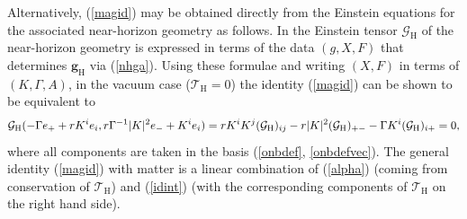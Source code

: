 \documentclass[11pt, reqno]{amsart}
\theoremstyle{plain}
\theoremstyle{definition}
\numberwithin{equation}{section}
\begin{document}
Alternatively, (\ref{magid}) may be obtained directly from the Einstein equations for the associated near-horizon geometry as follows. In \cite{KL13} the Einstein tensor $\mathcal{G}_{\text{H}}$ of the near-horizon geometry is expressed in terms of the data $(g,X,F)$ that determines $\textbf{g}_\text{H}$ via (\ref{nhga}). Using these formulae and writing $(X,F)$ in terms of $(K,\Gamma,A)$, in the vacuum case ($\mathcal{T}_{\text{H}} = 0$) the identity (\ref{magid}) can be shown to be equivalent to
\begin{equation} \label{idint}
\mathcal{G}_{\textup{H}}(-\Gamma e_++ rK^ie_i, r\Gamma^{-1}\vert K \vert^2e_- + K^ie_i) = rK^iK^j(\mathcal{G}_{\text{H}})_{ij} - r\vert K \vert^2(\mathcal{G}_{\text{H}})_{+-} - \Gamma K^i(\mathcal{G}_{\text{H}})_{i+} = 0,
\end{equation}
where all components are taken in the basis (\ref{onbdef}, \ref{onbdefvec}). The general identity (\ref{magid}) with matter is a linear combination of (\ref{alpha}) (coming from conservation of $\mathcal{T}_\text{H}$) and (\ref{idint}) (with the corresponding components of $\mathcal{T}_\text{H}$ on the right hand side).
\end{document}
